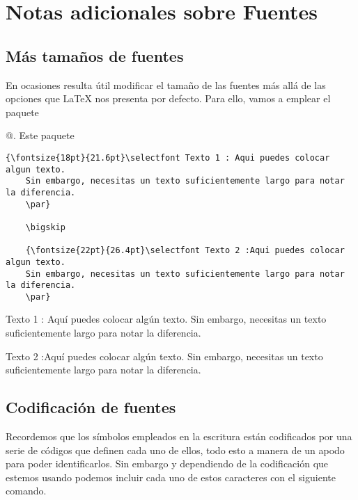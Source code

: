 \documentclass[a4,10pt]{aleph-notas}
\begin{document}
\encabezado

\informacion


\tableofcontents


\section{Notas adicionales sobre Fuentes}

\subsection{Más tamaños de fuentes}

En ocasiones resulta útil modificar el tamaño de las fuentes más allá de las opciones que \LaTeX{} nos presenta por defecto. Para ello, vamos a emplear el paquete \verb@\usepackage{anyfontsize}@. Este paquete 
\begin{lstlisting}[frame=single]
    {\fontsize{18pt}{21.6pt}\selectfont Texto 1 : Aqui puedes colocar algun texto. 
    Sin embargo, necesitas un texto suficientemente largo para notar la diferencia.
    \par}

    \bigskip
    
    {\fontsize{22pt}{26.4pt}\selectfont Texto 2 :Aqui puedes colocar algun texto. 
    Sin embargo, necesitas un texto suficientemente largo para notar la diferencia. 
    \par}
\end{lstlisting}

{\fontsize{18pt}{21.6pt}\selectfont Texto 1 : Aquí puedes colocar algún texto. Sin embargo, necesitas un texto suficientemente largo para notar la diferencia.\par}

\bigskip

{\fontsize{22pt}{26.4pt}\selectfont Texto 2 :Aquí puedes colocar algún texto. Sin embargo, necesitas un texto suficientemente largo para notar la diferencia. \par}

\subsection{Codificación de fuentes}

Recordemos que los símbolos empleados en la escritura están codificados por una serie de códigos que definen cada uno de ellos, todo esto a manera de un apodo para poder identificarlos. Sin embargo y dependiendo de la codificación que estemos usando podemos incluir cada uno de estos caracteres con el siguiente comando.
\end{document}
